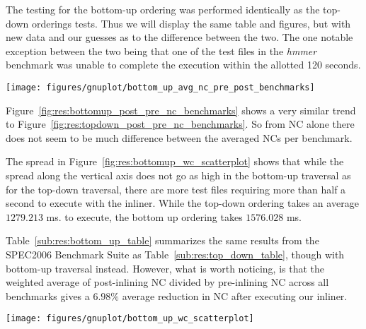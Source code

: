 The testing for the bottom-up ordering was performed identically as the top-down
orderings tests. Thus we will display the same table and figures, but with new
data and our guesses as to the difference between the two. The one notable
exception between the two being that one of the test files in the \textit{hmmer}
benchmark was unable to complete the execution within the allotted 120 seconds.

\begin{centering}
	\noindent\begin{minipage}{\textwidth}
		\captionsetup{type=figure}
		\hspace{-1em}
		\texttt{[image: figures/gnuplot/bottom\_up\_avg\_nc\_pre\_post\_benchmarks]}
	\end{minipage}
	\label{fig:res:bottomup_post_pre_nc_benchmarks}
\end{centering}

Figure~\ref{fig:res:bottomup_post_pre_nc_benchmarks} shows a very similar trend
to Figure~\ref{fig:res:topdown_post_pre_nc_benchmarks}. So from NC alone there
does not seem to be much difference between the averaged NCs per benchmark.

The spread in Figure~\ref{fig:res:bottomup_wc_scatterplot} shows that while the
spread along the vertical axis does not go as high in the bottom-up traversal as
for the top-down traversal, there are more test files requiring more than half a
second to execute with the inliner. While the top-down ordering takes an average
$1279.213$ ms. to execute, the bottom up ordering takes $1576.028$ ms.

Table~\ref{sub:res:bottom_up_table} summarizes the same results from the
SPEC2006 Benchmark Suite as Table~\ref{sub:res:top_down_table}, though with
bottom-up traversal instead. However, what is worth noticing, is that the
weighted average of post-inlining NC divided by pre-inlining NC across all
benchmarks gives a $6.98\%$ average reduction in NC after executing our
inliner.

\begin{centering}
	\noindent\begin{minipage}{\textwidth}
		\captionsetup{type=figure}
		\hspace{-1em}
		\texttt{[image: figures/gnuplot/bottom\_up\_wc\_scatterplot]}
	\end{minipage}
	\label{fig:res:bottomup_wc_scatterplot}
\end{centering}

